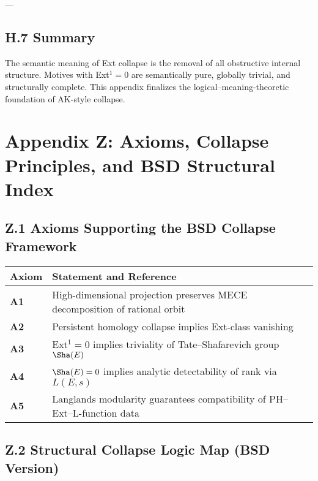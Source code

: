 ---

\subsection*{H.7 Summary}

The semantic meaning of Ext collapse is the removal of all obstructive internal structure.  
Motives with Ext$^1 = 0$ are semantically pure, globally trivial, and structurally complete.  
This appendix finalizes the logical–meaning-theoretic foundation of AK-style collapse.




\section*{Appendix Z: Axioms, Collapse Principles, and BSD Structural Index}

\subsection*{Z.1 Axioms Supporting the BSD Collapse Framework}

\begin{tabular}{ll}
\textbf{Axiom} & \textbf{Statement and Reference} \\
\hline
\textbf{A1} & High-dimensional projection preserves MECE decomposition of rational orbit \quad [Appendix C] \\
\textbf{A2} & Persistent homology collapse implies Ext-class vanishing \quad [Appendix B, G] \\
\textbf{A3} & Ext$^1 = 0$ implies triviality of Tate--Shafarevich group \( \Sha(E) \) \quad [Appendix A] \\
\textbf{A4} & \( \Sha(E) = 0 \) implies analytic detectability of rank via \( L(E,s) \)  \\
\textbf{A5} & Langlands modularity guarantees compatibility of PH–Ext–L-function data \quad [Appendix D] \\
\end{tabular}

\medskip

\subsection*{Z.2 Structural Collapse Logic Map (BSD Version)}

\begin{center}
\end{center}


